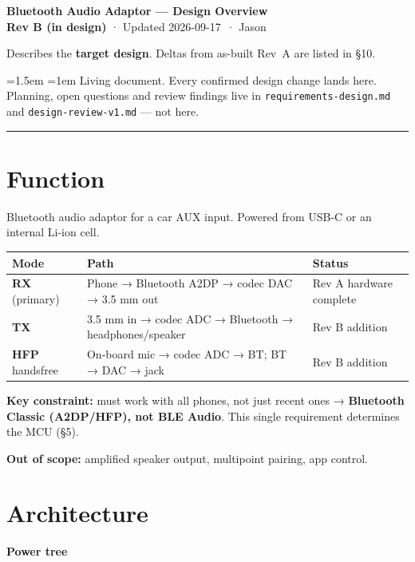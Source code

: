 \documentclass[11pt]{article}
\newenvironment{callout}
  {\par\medskip\noindent\begin{minipage}{\linewidth}\color{black}%
   \setlength{\parskip}{4pt}\leftskip=1.5em \rightskip=1em\relax}
  {\end{minipage}\par\medskip}
\newcommand{\docrev}{Rev B (in design)}
\newcommand{\docdate}{2026-09-17}
\newcommand{\docauthor}{Jason}
\begin{document}
\begin{center}
  {\LARGE\bfseries Bluetooth Audio Adaptor — Design Overview}\\[6pt]
  {\large\textbf{\docrev} · Updated \docdate\ · \docauthor}
\end{center}

Describes the \textbf{target design}. Deltas from as-built Rev~A are listed in §10.

\begin{callout}
Living document. Every confirmed design change lands here. Planning, open questions and review
findings live in \texttt{requirements-design.md} and \texttt{design-review-v1.md} — not here.
\end{callout}

\hrule
\section{Function}

Bluetooth audio adaptor for a car AUX input. Powered from USB-C or an internal Li-ion cell.

\begin{tabularx}{\linewidth}{@{}l X l@{}}
\toprule
\textbf{Mode} & \textbf{Path} & \textbf{Status} \\
\midrule
\textbf{RX} (primary) & Phone → Bluetooth A2DP → codec DAC → 3.5 mm out & Rev A hardware complete \\
\textbf{TX}           & 3.5 mm in → codec ADC → Bluetooth → headphones/speaker & Rev B addition \\
\textbf{HFP} handsfree & On-board mic → codec ADC → BT; BT → DAC → jack & Rev B addition \\
\bottomrule
\end{tabularx}

\textbf{Key constraint:} must work with all phones, not just recent ones → \textbf{Bluetooth Classic
(A2DP/HFP), not BLE Audio}. This single requirement determines the MCU (§5).

\textbf{Out of scope:} amplified speaker output, multipoint pairing, app control.

\section{Architecture}

\textbf{Power tree}
\end{document}
